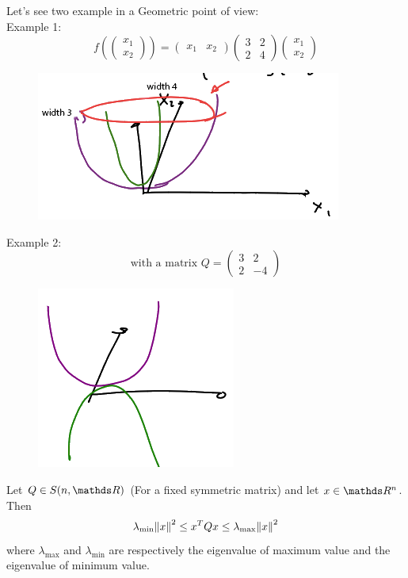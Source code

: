 \documentclass[ComputationalMathematics.tex]{subfiles}
\begin{document}
Let's see two example in a Geometric point of view:\\
Example 1:
$$ f(\begin{pmatrix} x_1\\ x_2 \end{pmatrix}) = \begin{pmatrix} x_1 & x_2 \end{pmatrix}
\begin{pmatrix} 3 & 2 \\ 2 & 4 \end{pmatrix}\begin{pmatrix} x_1\\ x_2 \end{pmatrix}
$$
\begin{figure}[H]
    \centering
    \includegraphics[scale = 0.45]{pics/26sett/quadratic_form_1.png}
\end{figure}

Example 2: 
$$\text{with a matrix } Q = \begin{pmatrix} 3 & 2 \\ 2 & -4 \end{pmatrix}$$
\begin{figure}[H]
    \centering
    \includegraphics[scale = 0.45]{pics/26sett/quadratic_form_2.png}
\end{figure}

\newpage
\begin{proposition}
  Let $Q \in S(n, \R)$ (For a fixed symmetric matrix) and let $x \in \R^n$. Then 
  $$\lambda_{\text{min}} {\left\lVert x\right\rVert}^2 \le {x}^{T}Qx \le \lambda_{\text{max}} {\left\lVert x\right\rVert}^2$$
  where $\lambda_{\text{max}}$ and $\lambda_{\text{min}}$ are respectively the eigenvalue of maximum value and the eigenvalue of minimum value.
\end{proposition}
\end{document}
